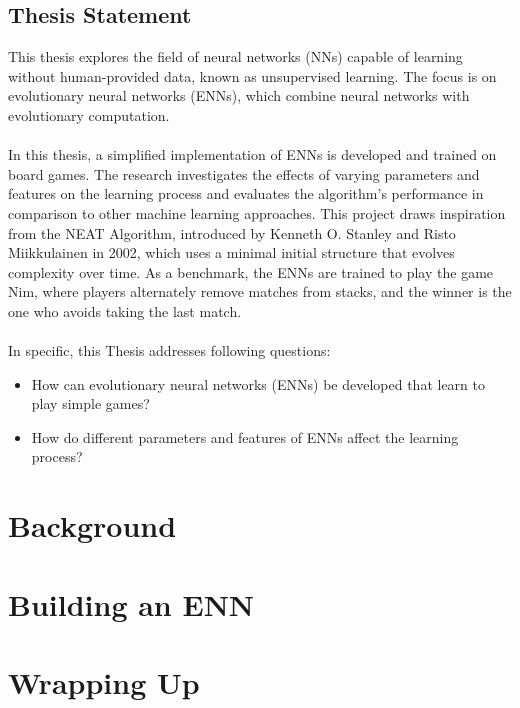 \documentclass[12pt]{report}
\begin{document}
    \section{Thesis Statement}\label{sec:thesis-statement}
    This thesis explores the field of neural networks (NNs) capable of learning without human-provided data, known as unsupervised learning.
    The focus is on evolutionary neural networks (ENNs), which combine neural networks with evolutionary computation.
    \\ \\
    In this thesis, a simplified implementation of ENNs is developed and trained on board games.
    The research investigates the effects of varying parameters and features on the learning process and evaluates the algorithm’s performance in comparison to other machine learning approaches.
    This project draws inspiration from the NEAT Algorithm, introduced by Kenneth O. Stanley and Risto Miikkulainen in 2002, which uses a minimal initial structure that evolves complexity over time.\cite[p.105-106]{Neat_02}
    As a benchmark, the ENNs are trained to play the game Nim, where players alternately remove matches from stacks, and the winner is the one who avoids taking the last match.
    \\ \\
    In specific, this Thesis addresses following questions:
    \begin{itemize}
        \item How can evolutionary neural networks (ENNs) be developed that learn to play simple games?
        \item How do different parameters and features of ENNs affect the learning process?
    \end{itemize}


    \chapter{Background}\label{ch:background}
    


    \chapter{Building an ENN}\label{ch:designing-an-enn}
    


    \chapter{Wrapping Up}\label{ch:wrapping-up}
    
\end{document}
